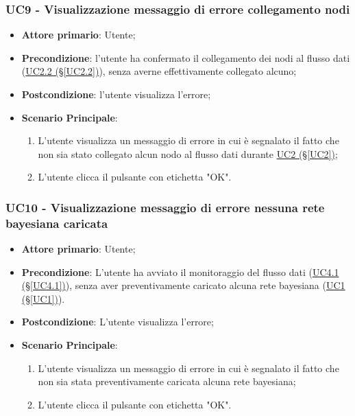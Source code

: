 \pagebreak

\subsubsection{UC9 - Visualizzazione messaggio di errore collegamento nodi}\label{UC9}
\begin{itemize}
\item \textbf{Attore primario}: Utente;
\item \textbf{Precondizione}: l'utente ha confermato il collegamento dei nodi al flusso dati (\hyperref[UC2.2]{UC2.2 (§\ref*{UC2.2})}), senza averne effettivamente collegato alcuno;
\item \textbf{Postcondizione}: l'utente visualizza l'errore;
\item \textbf{Scenario Principale}: 
	\begin{enumerate}
	\item L'utente visualizza un messaggio di errore in cui è segnalato il fatto che non sia stato collegato alcun 				nodo al flusso dati durante \hyperref[UC2]{UC2 (§\ref*{UC2})};
	\item L'utente clicca il pulsante con etichetta "OK".
	\end{enumerate}
\end{itemize}

\pagebreak

\subsubsection{UC10 - Visualizzazione messaggio di errore nessuna rete bayesiana caricata}\label{UC10}
\begin{itemize}
\item \textbf{Attore primario}: Utente;
\item \textbf{Precondizione}: L'utente ha avviato il monitoraggio del flusso dati (\hyperref[UC4.1]{UC4.1 (§\ref*{UC4.1})}), senza aver preventivamente caricato alcuna rete bayesiana (\hyperref[UC1]{UC1 (§\ref*{UC1})}).
\item \textbf{Postcondizione}: L'utente visualizza l'errore;
\item \textbf{Scenario Principale}: 
	\begin{enumerate}
	\item L'utente visualizza un messaggio di errore in cui è segnalato il fatto che non sia stata preventivamente 				caricata alcuna rete bayesiana;
	\item L'utente clicca il pulsante con etichetta "OK".
	\end{enumerate}
\end{itemize}

